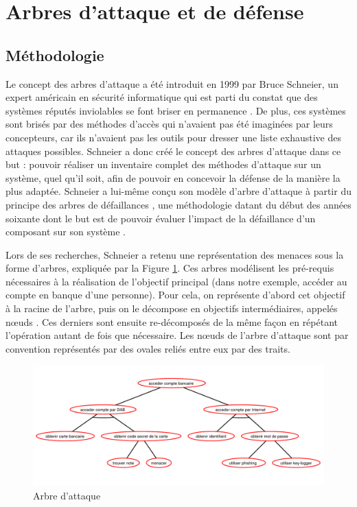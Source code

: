 \section{Arbres d'attaque et de défense}
	\label{sec:etat_art}

    \subsection{Méthodologie}
        Le concept des arbres d'attaque a été introduit en 1999 par Bruce Schneier, un expert américain en sécurité informatique qui est parti du constat que des systèmes réputés \og inviolables \fg se font briser en permanence \cite{doc_Schneier}. De plus, ces systèmes sont brisés par des méthodes d'accès qui n'avaient pas été imaginées par leurs concepteurs, car ils n'avaient pas les outils pour dresser une liste exhaustive des attaques possibles. Schneier a donc créé le concept des arbres d'attaque dans ce but : pouvoir réaliser un inventaire complet des méthodes d'attaque sur un système, quel qu'il soit, afin de pouvoir en concevoir la défense de la manière la plus adaptée. Schneier a lui-même conçu son modèle d'arbre d'attaque à partir du principe des \og arbres de défaillances \fg, une méthodologie datant du début des années soixante dont le but est de pouvoir évaluer l'impact de la défaillance d'un composant sur son système \cite{defaillanceTree}.

        Lors de ses recherches, Schneier a retenu une représentation des menaces sous la forme d'arbres, expliquée par la Figure \ref{fig:arbre_exemple_1}. Ces arbres modélisent les pré-requis nécessaires à la réalisation de l'objectif principal (dans notre exemple, accéder au compte en banque d'une personne). Pour cela, on représente d'abord cet objectif à la racine de l'arbre, puis on le décompose en objectifs intermédiaires, appelés \og nœuds \fg. Ces derniers sont ensuite re-décomposés de la même façon en répétant l'opération autant de fois que nécessaire. Les nœuds de l'arbre d'attaque sont par convention représentés par des ovales reliés entre eux par des traits.

        \begin{figure}[h]
            \centering
            \includegraphics[width=1\textwidth]{figure/exemple1_rapport.pdf}
            \caption{Arbre d'attaque}
            \label{fig:arbre_exemple_1}
        \end{figure}

